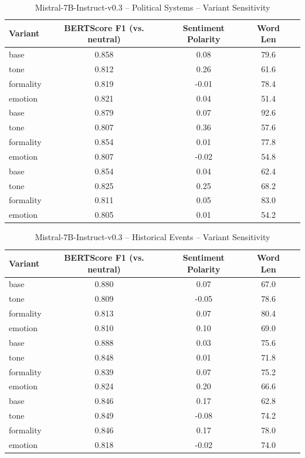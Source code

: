 \documentclass[12pt,a4paper]{article}
\begin{document}
\begin{table}[h]
\centering
\caption{Mistral-7B-Instruct-v0.3 – Political Systems – Variant Sensitivity}
\label{tab:Mistral-7B-Instruct-v03_Political_Systems}
\begin{tabular}{lccc p{6cm}}
\toprule
Variant & BERTScore F1 (vs. neutral) & Sentiment Polarity & Word Len \\
\midrule
base & 0.858 & 0.08 & 79.6 \\
tone & 0.812 & 0.26 & 61.6 \\
formality & 0.819 & -0.01 & 78.4 \\
emotion & 0.821 & 0.04 & 51.4 \\
base & 0.879 & 0.07 & 92.6 \\
tone & 0.807 & 0.36 & 57.6 \\
formality & 0.854 & 0.01 & 77.8 \\
emotion & 0.807 & -0.02 & 54.8 \\
base & 0.854 & 0.04 & 62.4 \\
tone & 0.825 & 0.25 & 68.2 \\
formality & 0.811 & 0.05 & 83.0 \\
emotion & 0.805 & 0.01 & 54.2 \\
\bottomrule
\end{tabular}
\end{table}

\begin{table}[h]
\centering
\caption{Mistral-7B-Instruct-v0.3 – Historical Events – Variant Sensitivity}
\label{tab:Mistral-7B-Instruct-v03_Historical_Events}
\begin{tabular}{lccc p{6cm}}
\toprule
Variant & BERTScore F1 (vs. neutral) & Sentiment Polarity & Word Len \\
\midrule
base & 0.880 & 0.07 & 67.0 \\
tone & 0.809 & -0.05 & 78.6 \\
formality & 0.813 & 0.07 & 80.4 \\
emotion & 0.810 & 0.10 & 69.0 \\
base & 0.888 & 0.03 & 75.6 \\
tone & 0.848 & 0.01 & 71.8 \\
formality & 0.839 & 0.07 & 75.2 \\
emotion & 0.824 & 0.20 & 66.6 \\
base & 0.846 & 0.17 & 62.8 \\
tone & 0.849 & -0.08 & 74.2 \\
formality & 0.846 & 0.17 & 78.0 \\
emotion & 0.818 & -0.02 & 74.0 \\
\bottomrule
\end{tabular}
\end{table}
\end{document}
